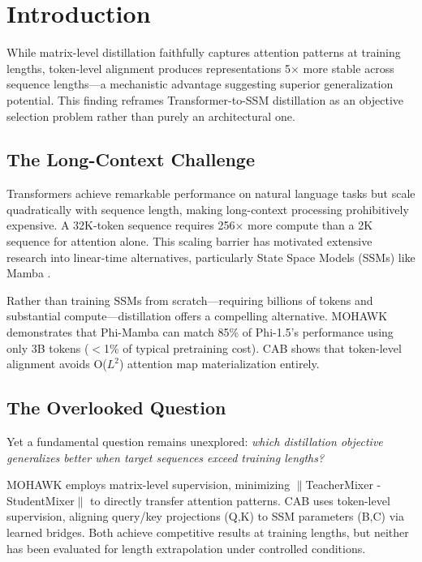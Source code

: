 \section{Introduction}

While matrix-level distillation faithfully captures attention patterns at training lengths, token-level alignment produces representations 5$\times$ more stable across sequence lengths---a mechanistic advantage suggesting superior generalization potential. This finding reframes Transformer-to-SSM distillation as an objective selection problem rather than purely an architectural one.

\subsection{The Long-Context Challenge}

Transformers achieve remarkable performance on natural language tasks but scale quadratically with sequence length, making long-context processing prohibitively expensive. A 32K-token sequence requires 256$\times$ more compute than a 2K sequence for attention alone. This scaling barrier has motivated extensive research into linear-time alternatives, particularly State Space Models (SSMs) like Mamba \citep{gu2023mamba}.

Rather than training SSMs from scratch---requiring billions of tokens and substantial compute---distillation offers a compelling alternative. MOHAWK \citep{bick2024mohawk} demonstrates that Phi-Mamba can match 85\% of Phi-1.5's performance using only 3B tokens ($<$1\% of typical pretraining cost). CAB \citep{wang2025cab} shows that token-level alignment avoids O($L^2$) attention map materialization entirely.

\subsection{The Overlooked Question}

Yet a fundamental question remains unexplored: \textit{which distillation objective generalizes better when target sequences exceed training lengths?}

MOHAWK employs matrix-level supervision, minimizing $\|$TeacherMixer - StudentMixer$\|$ to directly transfer attention patterns. CAB uses token-level supervision, aligning query/key projections (Q,K) to SSM parameters (B,C) via learned bridges. Both achieve competitive results at training lengths, but neither has been evaluated for length extrapolation under controlled conditions.

